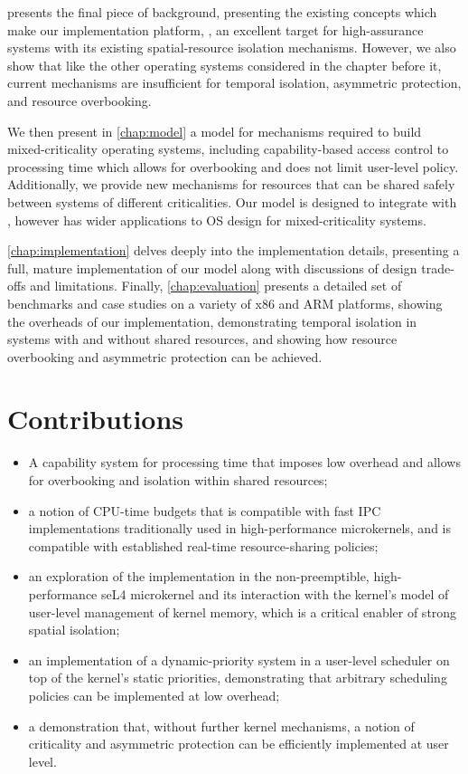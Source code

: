  presents the final piece of background, presenting the existing concepts which make
our implementation platform, \selfour, an excellent target for high-assurance systems with its
existing spatial-resource isolation mechanisms. However, we also show that like the other operating
systems considered in the chapter before it, current mechanisms are insufficient for temporal
isolation, asymmetric protection, and resource overbooking. 

We then present in \cref{chap:model} a model for mechanisms required to build mixed-criticality operating systems,
including capability-based access control to processing time which allows for overbooking and does
not limit user-level policy. Additionally, we provide new mechanisms for resources that can be
shared safely between systems of different criticalities. Our model is designed to integrate with
\selfour, however has wider applications to \gls{OS} design for mixed-criticality systems.

\cref{chap:implementation} delves deeply into the implementation details, presenting a full, mature
implementation of our model along with discussions of design trade-offs and limitations. Finally,
\cref{chap:evaluation} presents a detailed set of benchmarks and case studies on a variety of x86
and ARM platforms, showing the overheads
of our implementation, demonstrating temporal isolation in systems with and without shared
resources, and showing how resource overbooking and asymmetric protection can be achieved.

\section{Contributions}

\begin{itemize}
\item A capability system for processing time that imposes low overhead and allows for overbooking and isolation within shared resources;
\item a notion of CPU-time budgets that is compatible with
  fast IPC implementations traditionally used in high-performance
  microkernels, and is compatible with established real-time resource-sharing policies;
\item an exploration of the implementation in the non-preemptible, high-performance seL4
  microkernel and its interaction with the kernel's model of
  user-level management of kernel memory, which is a critical enabler
  of strong spatial isolation;
\item an implementation of a dynamic-priority system in a user-level
  scheduler on top of the kernel's static priorities, demonstrating
  that arbitrary scheduling policies can be implemented at low overhead;
\item a demonstration that, without further kernel mechanisms, a
  notion of criticality and asymmetric protection can be efficiently implemented at user level.
\end{itemize}

